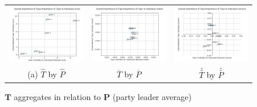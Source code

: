 \begin{singlespacing}
    \begin{figure}
        \centering
        \begin{tabular}{ccc}
        \includegraphics[width=50mm]{Figures/sum_opposing_centrality_chart_(mean_of_leaders)} &
        \includegraphics[width=50mm]{Figures/mean_opposing_centrality_chart_(mean_of_leaders)} &
        \includegraphics[width=50mm]{Figures/zscore_opposing_centrality_chart_(mean_of_leaders)} \\
        (a)  \textbf{$\hat{T}$} by \textbf{$\hat{P}$} & \textbf{$\overline{T}$} by \textbf{$\overline{P}$} &  \textbf{$\stackrel{z}{T}$} by \textbf{$\stackrel{z}{P}$} \\[6pt]
        \end{tabular}
        \caption[$\textbf{T}$ aggregates in relation to $\textbf{P}$ (party leader average)]{$\textbf{T}$ aggregates in relation to $\textbf{P}$ (party leader average)}
        \label{fig:topic_centrality_combined}
    \end{figure}
\end{singlespacing}


